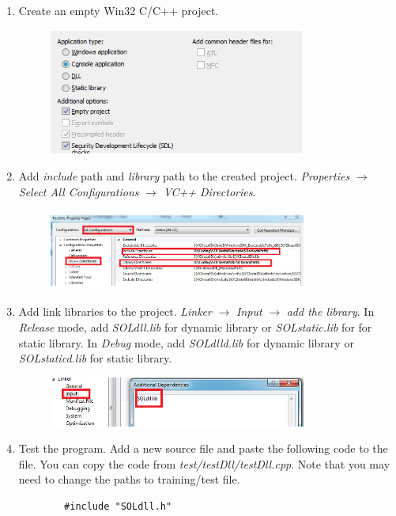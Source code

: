 \documentclass[11pt,a4paper]{article}
\newlength{\wideitemsep}
\let\olditem\item
\renewcommand{\item}{\setlength{\itemsep}{\wideitemsep}\olditem}
\begin{document}
\begin{enumerate}
    \item Create an empty Win32 C/C++ project.
        \begin{figure}[!h]
            \centering
            \includegraphics[width=0.8\textwidth]{figs/test_sol_new.png}
            \label{fig:test_sol_new}
        \end{figure}

    \item Add \emph{include} path and \emph{library} path to the created
        project. \emph{Properties} $\rightarrow$ \emph{Select All
        Configurations} $\rightarrow$ \emph{VC++ Directories}. 
        \begin{figure}[!h]
            \centering
            \includegraphics[width=0.8\textwidth]{figs/test_sol_config.png}
            \label{fig:test_sol_config}
        \end{figure}

    \item Add link libraries to the project. \emph{Linker} $\rightarrow$
        \emph{Input} $\rightarrow$ \emph{add the library}. In \emph{Release}
        mode, add \emph{SOLdll.lib} for dynamic library or \emph{SOLstatic.lib}
        for for static library. In \emph{Debug} mode, add \emph{SOLdlld.lib}
        for dynamic library or \emph{SOLstaticd.lib} for static library.
        \begin{figure}[!h]
            \centering
            \includegraphics[width=0.8\textwidth]{figs/test_sol_linker.png}
            \label{fig:test_sol_linker}
        \end{figure}
    \item Test the program. Add a new source file and paste the following code to
        the file. You can copy the code from \emph{test/testDll/testDll.cpp}.
        Note that you may need to change the paths to training/test file.
        \lstset{language=C++, 
            framexleftmargin=-1cm,
            xleftmargin=-1cm,
        }
        \begin{lstlisting}
        #include "SOLdll.h"


\end{lstlisting}
\end{enumerate}
\end{document}
